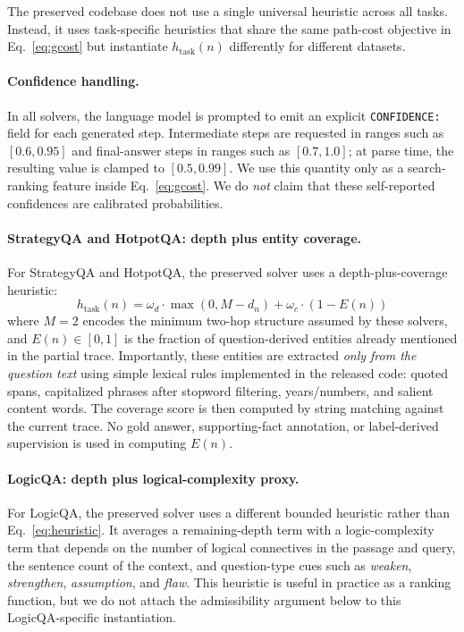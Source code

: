 \documentclass[11pt]{article}
\begin{document}
The preserved codebase does not use a single universal heuristic across all tasks. Instead, it uses task-specific heuristics that share the same path-cost objective in Eq.~\eqref{eq:gcost} but instantiate $h_{\text{task}}(n)$ differently for different datasets.

\paragraph{Confidence handling.} In all solvers, the language model is prompted to emit an explicit \texttt{CONFIDENCE:} field for each generated step. Intermediate steps are requested in ranges such as $[0.6, 0.95]$ and final-answer steps in ranges such as $[0.7, 1.0]$; at parse time, the resulting value is clamped to $[0.5, 0.99]$. We use this quantity only as a search-ranking feature inside Eq.~\eqref{eq:gcost}. We do \emph{not} claim that these self-reported confidences are calibrated probabilities.

\paragraph{StrategyQA and HotpotQA: depth plus entity coverage.} For StrategyQA and HotpotQA, the preserved solver uses a depth-plus-coverage heuristic:
\begin{equation}
h_{\text{task}}(n) = \omega_d \cdot \max(0, M - d_n) + \omega_c \cdot (1 - E(n))
\label{eq:heuristic}
\end{equation}
where $M=2$ encodes the minimum two-hop structure assumed by these solvers, and $E(n) \in [0,1]$ is the fraction of question-derived entities already mentioned in the partial trace. Importantly, these entities are extracted \emph{only from the question text} using simple lexical rules implemented in the released code: quoted spans, capitalized phrases after stopword filtering, years/numbers, and salient content words. The coverage score is then computed by string matching against the current trace. No gold answer, supporting-fact annotation, or label-derived supervision is used in computing $E(n)$.

\paragraph{LogicQA: depth plus logical-complexity proxy.} For LogicQA, the preserved solver uses a different bounded heuristic rather than Eq.~\eqref{eq:heuristic}. It averages a remaining-depth term with a logic-complexity term that depends on the number of logical connectives in the passage and query, the sentence count of the context, and question-type cues such as \emph{weaken}, \emph{strengthen}, \emph{assumption}, and \emph{flaw}. This heuristic is useful in practice as a ranking function, but we do not attach the admissibility argument below to this LogicQA-specific instantiation.
\end{document}
